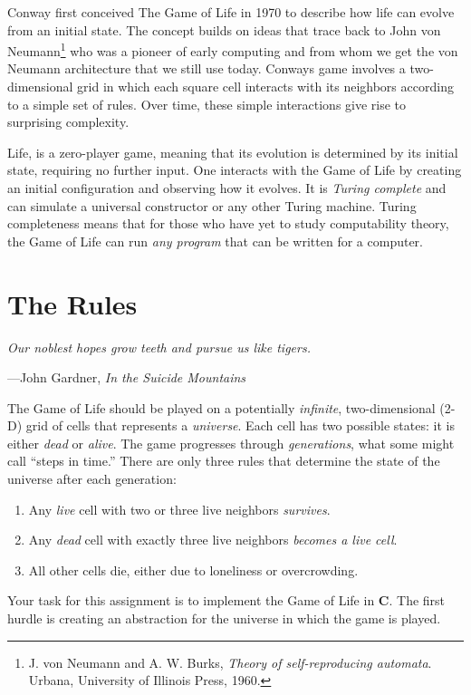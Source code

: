 \documentclass[11pt]{article}
\begin{document}
Conway first conceived The Game of Life in 1970 to describe how life can evolve
from an initial state. The concept builds on ideas that trace back to John von
Neumann\footnote{J. von Neumann and A. W. Burks, \emph{Theory of
self-reproducing automata}. Urbana, University of Illinois Press, 1960.} who was a
pioneer of early computing and from whom we get the von Neumann architecture that
we still use today.  Conways game involves a two-dimensional grid in which each
square cell interacts with its neighbors according to a simple set of rules. Over time,
these simple interactions give rise to surprising complexity.

Life, is a zero-player game, meaning that its evolution is
determined by its initial state, requiring no further input. One interacts with
the Game of Life by creating an initial configuration and observing how it
evolves. It is \emph{Turing complete} and can simulate a universal constructor or any
other Turing machine. Turing completeness means that for those who have yet to
study computability theory, the Game of Life can run \emph{any program} that can
be written for a computer.


\section{The Rules}
\textwidth
\epigraph{\emph{Our noblest hopes grow teeth and pursue us like tigers.}}
{---John Gardner, \emph{In the Suicide Mountains}}

The Game of Life should be played on a potentially \emph{infinite}, two-dimensional (2-D) grid of
cells that represents a \emph{universe}. Each cell has two possible states: it is
either \emph{dead} or \emph{alive}. The game progresses through
\emph{generations}, what some might call ``steps in time.'' There are only three rules
that determine the state of the universe after each generation:

\begin{enumerate}
  \item Any \emph{live} cell with two or three live neighbors \emph{survives}.
  \item Any \emph{dead} cell with exactly three live neighbors \emph{becomes a live cell}.
  \item All other cells die, either due to loneliness or overcrowding.
\end{enumerate}

Your task for this assignment is to implement the Game of Life in \textbf{C}.
The first hurdle is creating an abstraction for the universe in which the game
is played.
\end{document}
